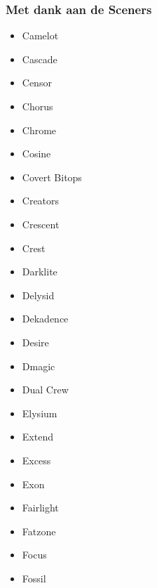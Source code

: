 \begin{frame}
\frametitle{Met dank aan de Sceners}

\begin{multicols}{3}
\begin{itemize}
\item Camelot
\item Cascade
\item Censor
\item Chorus
\item Chrome
\item Cosine
\item Covert Bitops
\item Creators
\item Crescent
\item Crest
\item Darklite
\item Delysid
\item Dekadence
\item Desire
\item Dmagic
\item Dual Crew
\item Elysium
\item Extend
\item Excess
\item Exon
\item Fairlight
\item Fatzone
\item Focus
\item Fossil
\end{itemize}
\end{multicols}

\end{frame}


